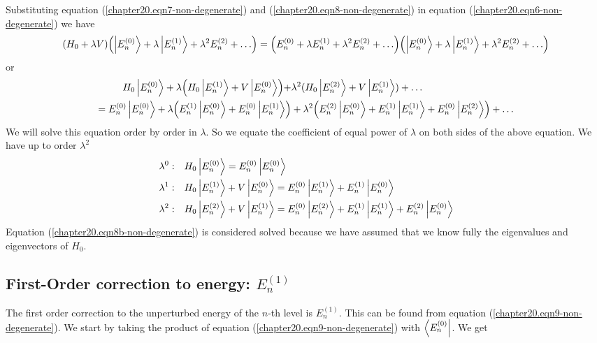 Substituting equation (\ref{chapter20.eqn7-non-degenerate}) and (\ref{chapter20.eqn8-non-degenerate}) in equation (\ref{chapter20.eqn6-non-degenerate}) we have
\begin{equation}
\qty(H_0 + \lambda V)\qty(\ket{E_n^{(0)}} + \lambda \ket{E_n^{(1)}} + \lambda^2 E_n^{(2)} + \ldots) 
= \qty(E_n^{(0)} + \lambda E_n^{(1)} + \lambda^2 E_n^{(2)} + \ldots)\qty(\ket{E_n^{(0)}} + \lambda \ket{E_n^{(1)}} + \lambda^2 E_n^{(2)} + \ldots)
\end{equation}
or
\begin{align*}
H_0 \ket{E_n^{(0)}} + \lambda \qty(H_0 \ket{E_n^{(1)}}  + V\ket{E_n^{(0)}})  + &\lambda^2(H_0 \ket{E_n^{(2)}} + V\ket{E_n^{(1)}}) + \ldots  \\
= E_n^{(0)} \ket{E_n^{(0)}} + \lambda\qty(E_n^{(1)}\ket{E_n^{(0)}} + E_n^{(0)}\ket{E_n^{(1)}})  
&+ \lambda^2 \qty(E_n^{(2)} \ket{E_n^{(0)}}  + E_n^{(1)}\ket{E_n^{(1)}}  +  E_n^{(0)}\ket{E_n^{(2)}}) + \ldots
\end{align*}
We will solve this equation order by order in $\lambda$. So we equate the coefficient of equal power of $\lambda$ on both sides of the above equation. We  have up to order $\lambda^2$
\begin{align}
\label{chapter20.eqn8b-non-degenerate}
\lambda^0 : \quad &  H_0 \ket{E_{n}^{(0)}} = E_n^{(0)}\ket{E_{n}^{(0)}} \\
\label{chapter20.eqn9-non-degenerate}
\lambda^1 : \quad & H_0\ket{E_{n}^{(1)}} + V\ket{E_{n}^{(0)}} = E_n^{(0)}\ket{E_{n}^{(1)}} + E_n^{(1)}\ket{E_{n}^{(0)}} \\
\label{chapter20.eqn10-non-degenerate}
\lambda^2 : \quad & H_0\ket{E_n^{(2)}} + V\ket{E_{n}^{(1)}} = E_n^{(0)}\ket{E_{n}^{(2)}} + E_{n}^{(1)}\ket{E_{n}^{(1)}}  + E_{n}^{(2)}\ket{E_{n}^{(0)}}
\end{align}
Equation (\ref{chapter20.eqn8b-non-degenerate}) is considered solved because we have assumed that we know fully the eigenvalues and eigenvectors of $H_0$.

\subsection{First-Order correction to energy: $E_n^{(1)}$}
The first order correction to the unperturbed energy of the $n$-th level is $E_n^{(1)}$. This can be found from equation (\ref{chapter20.eqn9-non-degenerate}). We start by taking the product of equation (\ref{chapter20.eqn9-non-degenerate}) with $\bra{E_n^{(0)}}$. We get


